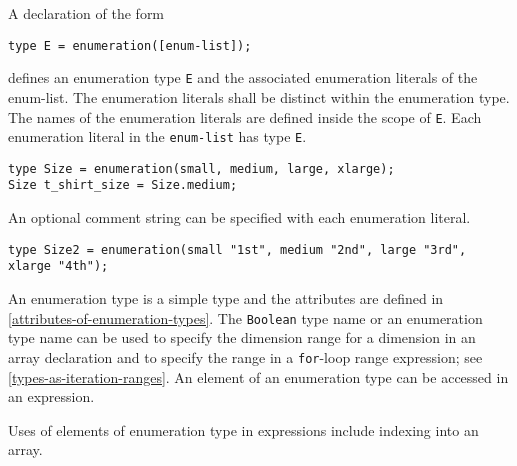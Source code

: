 A declaration of the form
\begin{lstlisting}[language=modelica]
type E = enumeration([enum-list]);
\end{lstlisting}%
defines an enumeration type \lstinline!E! and the associated enumeration literals of
the enum-list. The enumeration literals shall be distinct within the
enumeration type. The names of the enumeration literals are defined
inside the scope of \lstinline!E!. Each enumeration literal in the \lstinline!enum-list! has
type \lstinline!E!.

\begin{example}
\begin{lstlisting}[language=modelica]
type Size = enumeration(small, medium, large, xlarge);
Size t_shirt_size = Size.medium;
\end{lstlisting}
\end{example}

An optional comment string can be specified with each enumeration literal.

\begin{example}
\begin{lstlisting}[language=modelica]
type Size2 = enumeration(small "1st", medium "2nd", large "3rd", xlarge "4th");
\end{lstlisting}
\end{example}

An enumeration type is a simple type and the attributes are defined in \cref{attributes-of-enumeration-types}.
The \lstinline!Boolean! type name or an enumeration type name can be used to specify the dimension range for a dimension in an array declaration and to specify the range in a \lstinline!for!-loop range expression; see \cref{types-as-iteration-ranges}.
An element of an enumeration type can be accessed in an expression.

\begin{nonnormative}
Uses of elements of enumeration type in expressions include indexing into an array.
\end{nonnormative}


